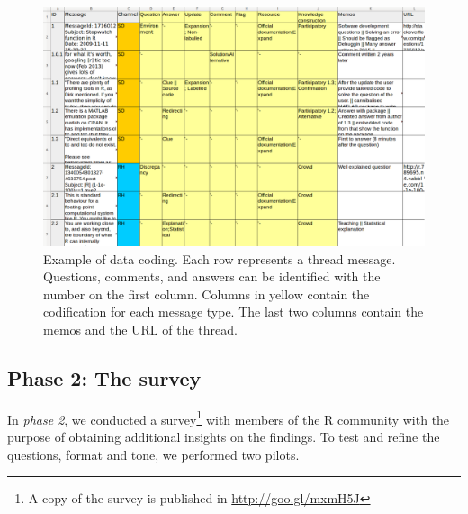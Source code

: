 \documentclass{sig-alternate-05-2015}
\begin{document}
	 	\begin{figure}[!ht]
			\centering
			\includegraphics[width=\columnwidth]{Figures/CodingExample}
			\caption{Example of data coding. Each row represents a thread message. Questions, comments, and answers can be identified with the number on the first column. Columns in yellow contain the codification for each message type. The last two columns contain the memos and the URL of the thread.}
			\label{fig:CodingExample}
		\end{figure}

\subsection{Phase 2: The survey} 

In \textit{phase 2}, we conducted a survey\footnote{A copy of the survey is published in \url{http://goo.gl/mxmH5J}} with members of the R community with the purpose of obtaining additional insights on the findings.
To test and refine the questions, format and tone, we performed two pilots.
\end{document}
